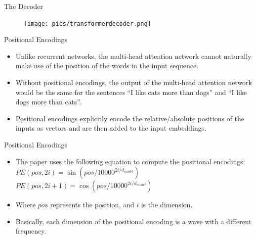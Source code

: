 \documentclass[handout]{beamer}
\begin{document}
\begin{frame}{The Decoder}

     \begin{figure}[h]
        	\texttt{[image: pics/transformerdecoder.png]}
        \end{figure}  


\end{frame}



\begin{frame}{Positional Encodings}
\begin{scriptsize}
\begin{itemize}

 \item  Unlike recurrent networks, the multi-head attention network cannot naturally make use of the position of the words in the input sequence.
 
 \item Without positional encodings, the output of the multi-head attention network would be the same for the sentences ``I like cats more than dogs'' and ``I like dogs more than cats''.
 
 \item Positional encodings explicitly encode the relative/absolute positions of the inputs as vectors and are then added to the input embeddings.

\end{itemize}

\end{scriptsize}


\end{frame}

\begin{frame}{Positional Encodings}
\begin{scriptsize}
\begin{itemize}

 \item The paper uses the following equation to compute the positional encodings: \\
 $PE(pos,2i) = \sin(pos/10000^{2i/d_{model}})$ 
  $PE(pos,2i+1) = \cos(pos/10000^{2i/d_{model}})$
 
\item Where $pos$ represents the position, and $i$ is the dimension.

\item Basically, each dimension of the positional encoding is a wave with a different frequency. 


\end{itemize}

\end{scriptsize}


\end{frame}
\end{document}
